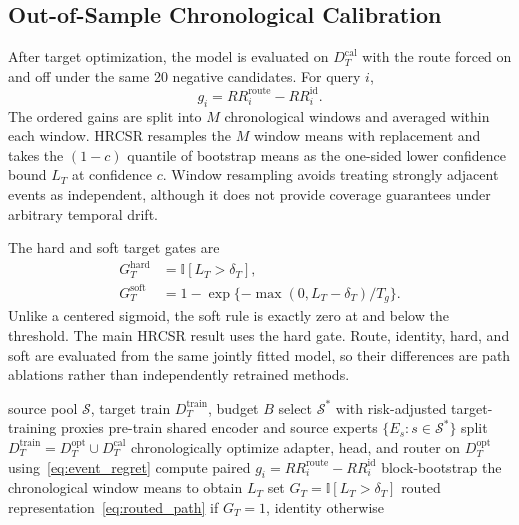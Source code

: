 \documentclass[journal]{IEEEtran}
\begin{document}
\subsection{Out-of-Sample Chronological Calibration}
After target optimization, the model is evaluated on $D_T^{\mathrm{cal}}$ with the route forced on and off under the same 20 negative candidates. For query $i$,
\begin{equation}
g_i=RR_i^{\mathrm{route}}-RR_i^{\mathrm{id}}.
\end{equation}
The ordered gains are split into $M$ chronological windows and averaged within each window. HRCSR resamples the $M$ window means with replacement and takes the $(1-c)$ quantile of bootstrap means as the one-sided lower confidence bound $L_T$ at confidence $c$. Window resampling avoids treating strongly adjacent events as independent, although it does not provide coverage guarantees under arbitrary temporal drift.

The hard and soft target gates are
\begin{align}
G_T^{\mathrm{hard}}&=\mathbb I[L_T>\delta_T],\\
G_T^{\mathrm{soft}}&=1-\exp\{-\max(0,L_T-\delta_T)/T_g\}.
\end{align}
Unlike a centered sigmoid, the soft rule is exactly zero at and below the threshold. The main HRCSR result uses the hard gate. Route, identity, hard, and soft are evaluated from the same jointly fitted model, so their differences are path ablations rather than independently retrained methods.

\begin{algorithm}[t]
\caption{HRCSR Transfer and Chronological Abstention}
\label{alg:hrcsr}
\begin{algorithmic}[1]
\REQUIRE source pool $\mathcal S$, target train $D_T^{\mathrm{train}}$, budget $B$
\STATE select $\mathcal S^*$ with risk-adjusted target-training proxies
\STATE pre-train shared encoder and source experts $\{E_s:s\in\mathcal S^*\}$
\STATE split $D_T^{\mathrm{train}}=D_T^{\mathrm{opt}}\cup D_T^{\mathrm{cal}}$ chronologically
\STATE optimize adapter, head, and router on $D_T^{\mathrm{opt}}$ using~\eqref{eq:event_regret}
  \STATE compute paired $g_i=RR_i^{\mathrm{route}}-RR_i^{\mathrm{id}}$
\ENDFOR
\STATE block-bootstrap the chronological window means to obtain $L_T$
\STATE set $G_T=\mathbb I[L_T>\delta_T]$
\RETURN routed representation~\eqref{eq:routed_path} if $G_T=1$, identity otherwise
\end{algorithmic}
\end{algorithm}
\end{document}
